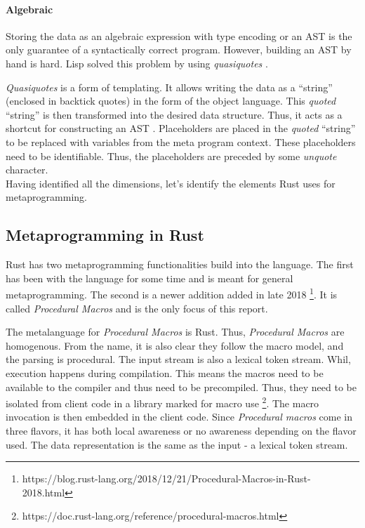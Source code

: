 \paragraph{Algebraic}
Storing the data as an algebraic expression with type encoding or an AST is the only guarantee of a syntactically correct program.
However, building an AST by hand is hard.
Lisp solved this problem by using \textit{quasiquotes} \cite{bawden_99_01}.

\textit{Quasiquotes} is a form of templating.
It allows writing the data as a ``string'' (enclosed in backtick quotes) in the form of the object language.
This \textit{quoted} ``string'' is then transformed into the desired data structure.
Thus, it acts as a shortcut for constructing an AST \cite{lilis_15_01}.
Placeholders are placed in the \textit{quoted} ``string'' to be replaced with variables from the meta program context.
These placeholders need to be identifiable.
Thus, the placeholders are preceded by some \textit{unquote} character. \cite{bawden_99_01} \\

Having identified all the dimensions, let's identify the elements Rust uses for metaprogramming.

\subsection{Metaprogramming in Rust}
Rust has two metaprogramming functionalities build into the language.
The first has been with the language for some time and is meant for general metaprogramming.
The second is a newer addition added in late 2018 \footnote{https://blog.rust-lang.org/2018/12/21/Procedural-Macros-in-Rust-2018.html}.
It is called \textit{Procedural Macros} and is the only focus of this report. \cite{klabnik_2019_01}

The metalanguage for \textit{Procedural Macros} is Rust.
Thus, \textit{Procedural Macros} are homogenous.
From the name, it is also clear they follow the macro model, and the parsing is procedural.
The input stream is also a lexical token stream.
Whil, execution happens during compilation.
This means the macros need to be available to the compiler and thus need to be precompiled.
Thus, they need to be isolated from client code in a library marked for macro use \footnote{https://doc.rust-lang.org/reference/procedural-macros.html}.
The macro invocation is then embedded in the client code.
Since \textit{Procedural macros} come in three flavors, it has both local awareness or no awareness depending on the flavor used.
The data representation is the same as the input - a lexical token stream.

